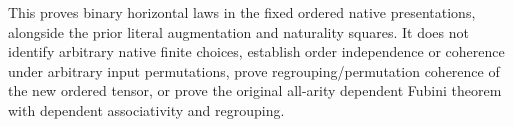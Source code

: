 \documentclass{article}
\begin{document}
This proves binary horizontal laws in the fixed ordered native
presentations, alongside the prior literal augmentation and
naturality squares. It does not identify arbitrary native finite
choices, establish order independence or coherence under arbitrary
input permutations, prove regrouping/permutation coherence of the new ordered tensor, or prove the original all-arity dependent
Fubini theorem with dependent associativity and regrouping.
\end{document}
